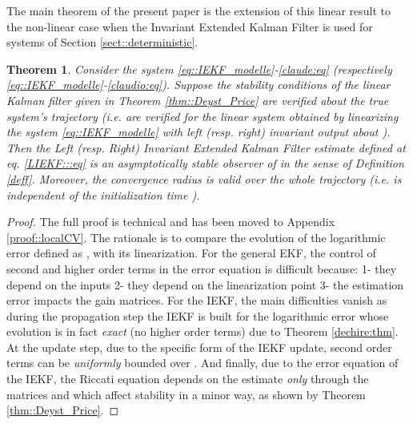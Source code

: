 \documentclass[a4paper,12pt,onecolumn]{article}
\newtheorem{thm}{Theorem}
\begin{document}
The main theorem of the present paper is the extension of this linear result to the non-linear case when the Invariant Extended Kalman Filter is used for systems of Section \ref{sect::deterministic}.
\begin{thm}
\label{thm::localCV}
Consider the system \eqref{eq::IEKF_modelle}-\eqref{claude:eq} (respectively  \eqref{eq::IEKF_modelle}-\eqref{claudio:eq}). Suppose the stability conditions of the linear Kalman filter given in Theorem \ref{thm::Deyst_Price} are verified  about the \emph{true} system's trajectory  (i.e. are verified for the linear system obtained by linearizing the system \eqref{eq::IEKF_modelle} with left (resp. right) invariant output about ). Then the Left (resp. Right) Invariant Extended Kalman Filter  estimate  defined at eq. \eqref{LIEKF:::eq} is an asymptotically stable observer of  in the sense of Definition \ref{deff}. Moreover, the convergence radius  is valid over the whole trajectory (i.e. is independent of the initialization time ).
\end{thm}
\begin{proof}
The full proof is technical and has been moved to Appendix \ref{proof::localCV}.  The rationale is to compare the evolution of the logarithmic error  defined as , with its linearization. For the general EKF, the control of second and higher order terms in the error equation is difficult because: 1- they depend on the inputs  2- they depend on the linearization point  3- the estimation error impacts the gain matrices. 
For the IEKF, the main difficulties vanish as during the propagation step the IEKF is built for the  logarithmic error  whose evolution  is in fact \emph{exact}  (no higher order terms) due to  Theorem \ref{dechire:thm}. At the update step, due to the specific form of the IEKF update, second order terms can be \emph{uniformly}  bounded over . And finally, due to the error equation of the IEKF, the Riccati equation depends on the estimate \emph{only} through the  matrices  and  which affect stability in a minor way, as shown by  Theorem \ref{thm::Deyst_Price}.



\end{proof}
\end{document}
